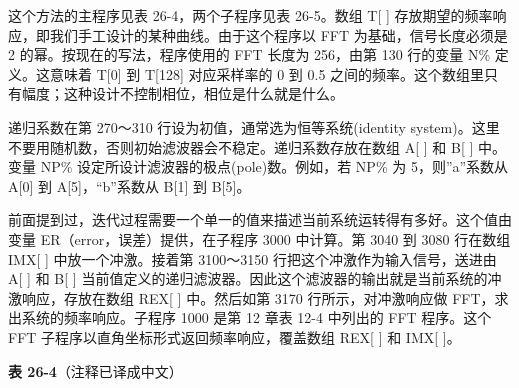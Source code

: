 这个方法的主程序见表 26-4，两个子程序见表 26-5。数组 T{[} {]}
存放期望的频率响应，即我们手工设计的某种曲线。由于这个程序以 FFT
为基础，信号长度必须是 2 的幂。按现在的写法，程序使用的 FFT 长度为
256，由第 130 行的变量 N\% 定义。这意味着 T{[}0{]} 到 T{[}128{]}
对应采样率的 0 到 0.5
之间的频率。这个数组里只有幅度；这种设计不控制相位，相位是什么就是什么。

递归系数在第 270～310 行设为初值，通常选为恒等系统(identity
system)。这里不要用随机数，否则初始滤波器会不稳定。递归系数存放在数组
A{[} {]} 和 B{[} {]} 中。变量 NP\%
设定所设计滤波器的极点(pole)数。例如，若 NP\% 为 5，则''a''系数从
A{[}0{]} 到 A{[}5{]}，``b''系数从 B{[}1{]} 到 B{[}5{]}。

前面提到过，迭代过程需要一个单一的值来描述当前系统运转得有多好。这个值由变量
ER（error，误差）提供，在子程序 3000 中计算。第 3040 到 3080 行在数组
IMX{[} {]} 中放一个冲激。接着第 3100～3150
行把这个冲激作为输入信号，送进由 A{[} {]} 和 B{[} {]}
当前值定义的递归滤波器。因此这个滤波器的输出就是当前系统的冲激响应，存放在数组
REX{[} {]} 中。然后如第 3170 行所示，对冲激响应做
FFT，求出系统的频率响应。子程序 1000 是第 12 章表 12-4 中列出的 FFT
程序。这个 FFT 子程序以直角坐标形式返回频率响应，覆盖数组 REX{[} {]} 和
IMX{[} {]}。

\textbf{表 26-4}（注释已译成中文）

